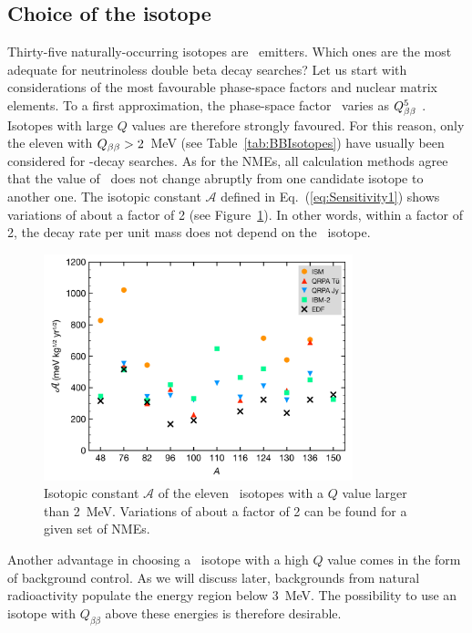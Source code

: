 \documentclass{PoS}
\begin{document}
\subsection{Choice of the isotope} \label{subsec:Isotope}
Thirty-five naturally-occurring isotopes are \bb\ emitters. Which ones are the most adequate for neutrinoless double beta decay searches? Let us start with considerations of the most favourable phase-space factors and nuclear matrix elements. To a first approximation, the phase-space factor \Gonu\ varies as $Q_{\beta\beta}^5$ \cite{Kotila:2012zza}. Isotopes with large $Q$ values are therefore strongly favoured. For this reason, only the eleven with $Q_{\beta\beta}>2$~MeV (see Table~\ref{tab:BBIsotopes}) have usually been considered for \bbonu-decay searches. As for the NMEs, all calculation methods agree that the value of \Monu\ does not change abruptly from one candidate isotope to another one. The isotopic constant $\mathcal{A}$ defined in Eq.~(\ref{eq:Sensitivity1}) shows variations of about a factor of 2 (see Figure~\ref{fig:IsotopicConstant}). In other words, within a factor of 2, the decay rate per unit mass does not depend on the \bb\ isotope.

\begin{figure}[p]
\centering
\includegraphics[width=0.8\textwidth]{img/SpecificSensitivity.pdf}
\caption{Isotopic constant $\mathcal{A}$  of the eleven \bb\ isotopes
with a $Q$ value larger than 2~MeV. Variations of about a factor of 2 can be found for a given set of NMEs.} \label{fig:IsotopicConstant}
\end{figure}


Another advantage in choosing a \bb\ isotope with a high $Q$ value comes in the form of background control. As we will discuss later, backgrounds from natural radioactivity populate the energy region below 3~MeV. The possibility to use an isotope with $Q_{\beta\beta}$ above these energies is therefore desirable.
\end{document}
